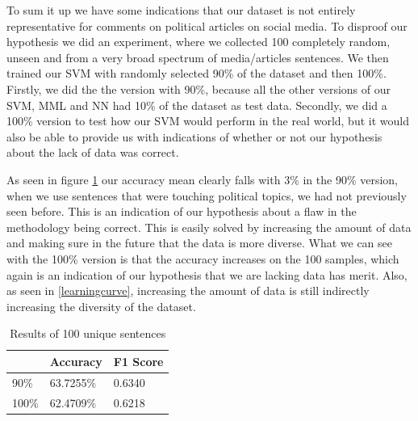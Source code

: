 To sum it up we have some indications that our dataset is not entirely representative for comments on political articles on social media. To disproof our hypothesis we did an experiment, where we collected 100 completely random, unseen and from a very broad spectrum of media/articles sentences. We then trained our SVM with randomly selected 90\% of the dataset and then 100\%. Firstly, we did the the version with 90\%, because all the other versions of our SVM, MML and NN had 10\% of the dataset as test data. Secondly, we did a 100\% version to test how our SVM would perform in the real world, but it would also be able to provide us with indications of whether or not our hypothesis about the lack of data was correct. 

As seen in figure \ref{shit} our accuracy mean clearly falls with 3\% in the 90\% version, when we use sentences that were touching political topics, we had not previously seen before. This is an indication of our hypothesis about a flaw in the methodology being correct. This is easily solved by increasing the amount of data and making sure in the future that the data is more diverse. What we can see with the 100\% version is that the accuracy increases on the 100 samples, which again is an indication of our hypothesis that we are lacking data has merit. Also, as seen in \ref{learningcurve}, increasing the amount of data is still indirectly increasing the diversity of the dataset.

\begin{table}[H]
	\begin{tabular}{@{}lll@{}}
		\toprule
		& Accuracy  & F1 Score \\ \midrule
		90\%  & 63.7255\% & 0.6340   \\
		100\% & 62.4709\% & 0.6218   \\ \bottomrule
	\end{tabular}
	\centering
	\caption{Results of 100 unique sentences}
	\label{shit}
\end{table}



